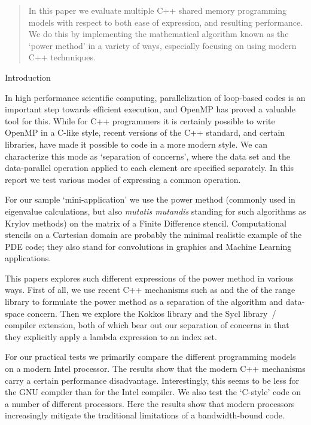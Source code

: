
\begin{abstract}
  In this paper we evaluate multiple C++ shared memory
  programming models
  with respect to both ease of expression, and resulting performance.
  We do this by implementing the mathematical algorithm
  known as the `power method' in a variety of ways,
  especially focusing on using modern C++ technniques.
\end{abstract}

 {Introduction}

In high performance scientific computing,
parallelization of loop-based codes is an important
step towards efficient execution,
and OpenMP has proved a valuable tool for this.
While for C++ programmers it is certainly possible
to write OpenMP in a C-like style,
recent versions of the C++ standard,
and certain libraries,
have made it possible to code in a more modern style.
We can characterize this mode as `separation of concerns',
where the data set
and the data-parallel operation applied to each element
are specified separately.
In this report we test various modes of expressing
a common operation.

For our sample `mini-application' we use the power method
(commonly used in eigenvalue calculations, but also
\emph{mutatis mutandis} standing for such algorithms
as Krylov methods)
on the matrix of a Finite Difference stencil.
Computational stencils on a Cartesian domain are probably the minimal realistic
example of the PDE code; they also stand for convolutions
in graphics and Machine Learning applications.

This papers explores such different expressions of the power method
in various ways.
First of all, we use recent C++ mechanisms
such as  and the 
of the range library to formulate the power method
as a separation of the algorithm and data-space concern.
Then we explore the Kokkos library and the Sycl
library~/ compiler extension, both of which
bear out our separation of concerns
in that they explicitly apply a lambda expression to an index set.

For our practical tests we primarily compare the different programming models
on a modern Intel processor. The results show that the modern C++
mechanisms carry a certain performance disadvantage.
Interestingly, this seems to be less for the GNU compiler than
for the Intel compiler.
We also test the `C-style' code on a number of different processors.
Here the results show that modern processors increasingly
mitigate the traditional limitations of a bandwidth-bound code.

